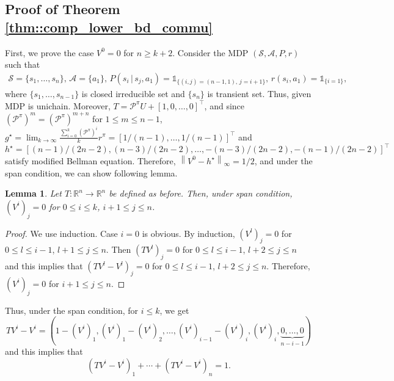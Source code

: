 \documentclass{article} %
\newcommand{\cA}{\mathcal{A}}
\newcommand{\cS}{\mathcal{S}}
\newcommand{\cP}{\mathcal{P}}
\newcommand{\real}{\mathbb{R}}
\newcommand*{\para}[1]{\left({#1}\right)}
\newcommand*{\infn}[1]{\left\|{#1}\right\|_{\infty}}
\newtheorem{lemma}{Lemma}
\begin{document}
\vspace{0.1in}


\subsection{Proof of Theorem \ref{thm::comp_lower_bd_commu}}

First, we prove the case $V^0=0$ for $n\ge k+2$. Consider the MDP $(\cS, \cA, P, r)$ such that  
\begin{align*}
        \cS=\{s_1,\dots, s_{n}\}, \, \cA=\{a_1\}, \, P(s_i\,|\,s_j,a_1)=\mathds{1}_{\{(i,j)=(n-1,1), \,j=i+1 \}}, \, r(s_i, a_1)=\mathds{1}_{\{i=1\}},
\end{align*}
where $\{s_1,\dots, s_{n-1}\}$ is closed irreducible set and $\{s_n\}$ is transient set. Thus, given MDP is unichain. Moreover, $T= \cP^{\pi}U+[1,0, \dots, 0]^{\intercal}$, and since $(\cP^{\pi})^m= (\cP^{\pi})^{m+n}$ for $1 \le m \le n-1$, $g^{\star}= \lim_{k \rightarrow \infty}\frac{\sum^k_{i=0}\para{\cP^{\pi}}^i}{k}r^{\pi}=[1/(n-1), \dots, 1/(n-1)]^{\intercal}$ and $h^{\star} = [(n-1)/(2n-2),(n-3)/(2n-2), \dots, -(n-3)/(2n-2), -(n-1)/(2n-2)]^{\intercal}$ satisfy modified Bellman equation. Therefore, $\infn{V^0-h^{\star}}=1/2$, and under the span condition, we can show following lemma.



\begin{lemma}
   Let $T \colon\real^{n} \rightarrow \real^{n}$ be defined as before. Then, under span condition,  $(V^i)_j = 0$ for $0 \le i \le k$, $i+1 \le j \le n $.
\end{lemma}
\begin{proof}
     We use induction. Case $i=0$ is obvious. By induction, $\para{V^l}_j=0$ for $0 \le l \le i-1$, $l+1 \le j \le n$. Then $\para{TV^l}_j=0$ for $0 \le l \le i-1$, $l+2 \le j \le n$ and this implies that 
    $\para{TV^l-V^l}_j=0$ for $0 \le l \le i-1$, $l+2 \le j \le n$. Therefore, $\para{V^i}_{j}=0$ for $ i+1 \le j \le n$.
\end{proof}
Thus, under the span condition, for $i \le k$, we get
\[TV^i-V^i = (1-(V^i)_1, (V^i)_1-(V^i)_2,\dots, (V^i)_{i-1}-(V^i)_{i},  (V^{i})_{i}, \underbrace{0, \dots, 0}_{n-i-1})\]
and this implies that
\[ (TV^i-V^i)_1+ \cdots +(TV^i-V^i)_{n} = 1. \]
\end{document}
